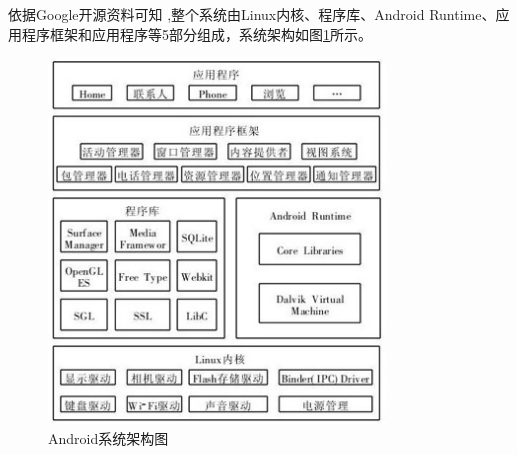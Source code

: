 \documentclass{XDBAthesis}
\begin{document}
    依据Google开源资料可知\cite{王茜2011Android} ,整个系统由Linux内核、程序库、Android Runtime、应用程序框架和应用程序等5部分组成，系统架构如图\ref{fg:android}所示。
\begin{figure}[htb]
    \centering
    \includegraphics[width=0.8\textwidth]{figure/android}
    \caption{Android系统架构图}
    \label{fg:android}        
\end{figure}
    
\end{document}
